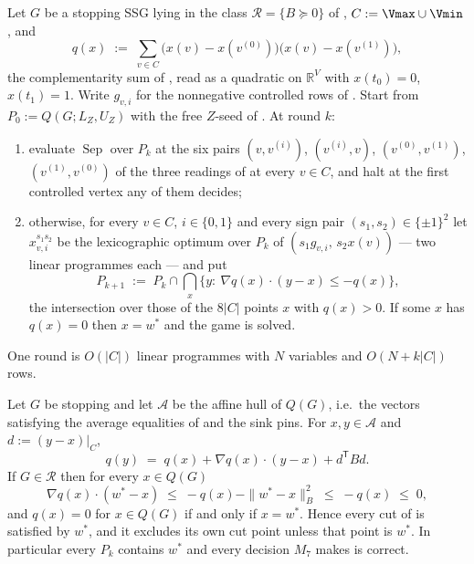 
\begin{definition}\label{hz:m7}
Let $G$ be a stopping SSG lying in the class $\mathcal R=\{B\succeq0\}$ of
, $C:=\Vmax\cup\Vmin$, and
\[
  q(x)\;:=\;\sum_{v\in C}\bigl(x(v)-x(v^{(0)})\bigr)\bigl(x(v)-x(v^{(1)})\bigr),
\]
the complementarity sum of , read as a quadratic
on $\mathbb R^{V}$ with $x(t_0)=0$, $x(t_1)=1$. Write $g_{v,i}$ for the
nonnegative controlled rows of . Start from
$P_0:=Q(G;L_Z,U_Z)$ with the free $Z$-seed of .
At round $k$:
\begin{enumerate}[label=\textup{(\arabic*)},leftmargin=2.6em]
\item evaluate $\operatorname{Sep}$ over $P_k$ at the six pairs
      $(v,v^{(i)})$, $(v^{(i)},v)$, $(v^{(0)},v^{(1)})$, $(v^{(1)},v^{(0)})$
      of the three readings of  at every $v\in C$, and
      halt at the first controlled vertex any of them decides;
\item otherwise, for every $v\in C$, $i\in\{0,1\}$ and every sign pair
      $(s_1,s_2)\in\{\pm1\}^2$ let $x^{s_1s_2}_{v,i}$ be the lexicographic
      optimum over $P_k$ of $(s_1g_{v,i},\,s_2x(v))$ --- two linear programmes
      each --- and put
      \[
        P_{k+1}\;:=\;P_k\cap\bigcap_{x}\bigl\{y:\ \nabla q(x)\cdot(y-x)\le-q(x)\bigr\},
      \]
      the intersection over those of the $8|C|$ points $x$ with $q(x)>0$. If
      some $x$ has $q(x)=0$ then $x=w^\ast$ and the game is solved.
\end{enumerate}
One round is $O(|C|)$ linear programmes with $N$ variables and $O(N+k|C|)$ rows.
\end{definition}

\begin{lemma}\label{hz:cut}
Let $G$ be stopping and let $\mathcal A$ be the affine hull of $Q(G)$, i.e.\ the
vectors satisfying the average equalities of  and the sink
pins. For $x,y\in\mathcal A$ and $d:=(y-x)|_C$,
\[
  q(y)\;=\;q(x)+\nabla q(x)\cdot(y-x)+d^{\mathsf T}Bd .
\]
If $G\in\mathcal R$ then for every $x\in Q(G)$
\[
  \nabla q(x)\cdot(w^\ast-x)\;\le\;-q(x)-\|w^\ast-x\|_B^{2}\;\le\;-q(x)\;\le\;0,
\]
and $q(x)=0$ for $x\in Q(G)$ if and only if $x=w^\ast$. Hence every cut of
 is satisfied by $w^\ast$, and it excludes its own cut point unless
that point is $w^\ast$. In particular every $P_k$ contains $w^\ast$ and every
decision $M_7$ makes is correct.
\end{lemma}

